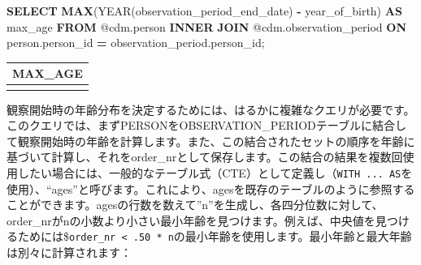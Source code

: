 \documentclass[
  11pt]{book}
\newenvironment{Shaded}{\begin{snugshade}}{\end{snugshade}}
\newcommand{\DataTypeTok}[1]{\textcolor[rgb]{0.13,0.29,0.53}{#1}}
\newcommand{\FunctionTok}[1]{\textcolor[rgb]{0.13,0.29,0.53}{\textbf{#1}}}
\newcommand{\KeywordTok}[1]{\textcolor[rgb]{0.13,0.29,0.53}{\textbf{#1}}}
\newcommand{\NormalTok}[1]{#1}
\newcommand{\OperatorTok}[1]{\textcolor[rgb]{0.81,0.36,0.00}{\textbf{#1}}}
\theoremstyle{definition}
\theoremstyle{definition}
\theoremstyle{definition}
\theoremstyle{definition}
\theoremstyle{remark}
\begin{document}
\begin{Shaded}
\begin{Highlighting}[]
\KeywordTok{SELECT} \FunctionTok{MAX}\NormalTok{(}\DataTypeTok{YEAR}\NormalTok{(observation\_period\_end\_date) }\OperatorTok{{-}}
\NormalTok{           year\_of\_birth) }\KeywordTok{AS}\NormalTok{ max\_age}
\KeywordTok{FROM}\NormalTok{ @cdm.person}
\KeywordTok{INNER} \KeywordTok{JOIN}\NormalTok{ @cdm.observation\_period}
  \KeywordTok{ON}\NormalTok{ person.person\_id }\OperatorTok{=}\NormalTok{ observation\_period.person\_id;}
\end{Highlighting}
\end{Shaded}

\begin{longtable}[]{@{}r@{}}
\toprule\noalign{}
MAX\_AGE \\
\midrule\noalign{}
\endhead
\bottomrule\noalign{}
\endlastfoot
90 \\
\end{longtable}

観察開始時の年齢分布を決定するためには、はるかに複雑なクエリが必要です。このクエリでは、まずPERSONをOBSERVATION\_PERIODテーブルに結合して観察開始時の年齢を計算します。また、この結合されたセットの順序を年齢に基づいて計算し、それをorder\_nrとして保存します。この結合の結果を複数回使用したい場合には、一般的なテーブル式（CTE）として定義し（\texttt{WITH\ ...\ AS}を使用）、``ages''と呼びます。これにより、agesを既存のテーブルのように参照することができます。agesの行数を数えて''n''を生成し、各四分位数に対して、order\_nrがnの小数より小さい最小年齢を見つけます。例えば、中央値を見つけるためには\$\texttt{order\_nr\ \textless{}\ .50\ *\ n}の最小年齢を使用します。最小年齢と最大年齢は別々に計算されます：
\end{document}
